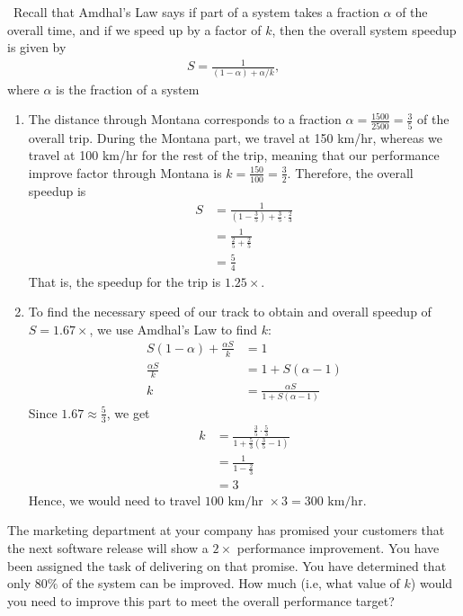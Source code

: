 \documentclass[12pt]{article}
\newenvironment{ex}[2][Exercise]{\begin{trivlist}
		\item[\hskip \labelsep {\bfseries #1}\hskip \labelsep {\bfseries #2.}]}{\end{trivlist}}
\newenvironment{sol}[1][Solution]{\begin{trivlist}
		\item[\hskip \labelsep {\bfseries #1:}]}{\end{trivlist}}
\begin{document}
\begin{sol}
	\
	Recall that Amdhal's Law says if part of a system takes a fraction
	$\alpha$ of the overall time, and if we speed up by a factor of $k$,
	then the overall system speedup is given by
	\begin{align*}
		S=\frac{1}{(1-\alpha)+\alpha/k},
	\end{align*}
	where $\alpha$ is the fraction of a system
	\begin{enumerate}[label=(\alph*)]
		\item The distance through Montana corresponds to a fraction
		$\alpha=\frac{1500}{2500}=\frac{3}{5}$ of the overall trip.
		During the Montana part, we travel at 150 km/hr, whereas we
		travel at 100 km/hr for the rest of the trip, meaning that
		our performance improve factor through Montana is
		$k=\frac{150}{100}=\frac{3}{2}$. Therefore, the overall
		speedup is
		\begin{align*}
			S&=\frac{1}{(1-\frac{3}{5})+\frac{3}{5}\cdot \frac{2}{3}}\\
			&=\frac{1}{\frac{2}{5}+\frac{2}{5}}\\
			&=\frac{5}{4}
		\end{align*}
		That is, the speedup for the trip is $1.25\times$.
		\item To find the necessary speed of our track to obtain and
		overall speedup of $S=1.67\times$, we use Amdhal's Law to find $k$:
		\begin{align*}
			S(1-\alpha)+\frac{\alpha S}{k}&=1\\
			\frac{\alpha S}{k}&=1+S(\alpha-1)\\
			k&=\frac{\alpha S}{1+S(\alpha -1)}
		\end{align*}
		Since $1.67\approx \frac{5}{3}$, we get
		\begin{align*}
			k&=\frac{\frac{3}{5}\cdot \frac{5}{3}}{1+\frac{5}{3}\left(\frac{3}{5}-1\right)}\\
			&=\frac{1}{1-\frac{2}{3}}\\
			&=3
		\end{align*}
		Hence, we would need to travel $100\text{ km/hr } \times 3=300\text{ km/hr}$.
	\end{enumerate}
\end{sol}

\begin{ex}{2}
	The marketing department at your company has promised your customers that
	the next software release will show a $2\times$ performance improvement.
	You have been assigned the task of delivering on that promise. You have
	determined that only $80\%$ of the system can be improved. How much (i.e,
	what value of $k$) would you need to improve this part to meet the overall
	performance target?
\end{ex}
\end{document}
